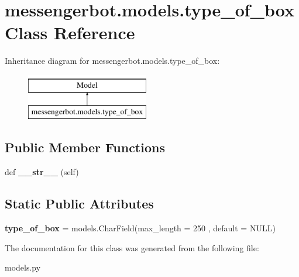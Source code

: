 \hypertarget{classmessengerbot_1_1models_1_1type__of__box}{}\section{messengerbot.\+models.\+type\+\_\+of\+\_\+box Class Reference}
\label{classmessengerbot_1_1models_1_1type__of__box}
Inheritance diagram for messengerbot.\+models.\+type\+\_\+of\+\_\+box\+:\begin{figure}[H]
\begin{center}
\leavevmode
\includegraphics[height=2.000000cm]{classmessengerbot_1_1models_1_1type__of__box}
\end{center}
\end{figure}
\subsection*{Public Member Functions}
\begin{DoxyCompactItemize}
\item 
\mbox{\label{classmessengerbot_1_1models_1_1type__of__box_ab6bfc5fff4cd1d8144d037d559cbb932}} 
def {\bfseries \+\_\+\+\_\+str\+\_\+\+\_\+} (self)
\end{DoxyCompactItemize}
\subsection*{Static Public Attributes}
\begin{DoxyCompactItemize}
\item 
\mbox{\label{classmessengerbot_1_1models_1_1type__of__box_a42410a03c6abf8fe27bb9b21ba3abe42}} 
{\bfseries type\+\_\+of\+\_\+box} = models.\+Char\+Field(max\+\_\+length = 250 , default = \textquotesingle{}N\+U\+LL\textquotesingle{})
\end{DoxyCompactItemize}


The documentation for this class was generated from the following file\+:\begin{DoxyCompactItemize}
\item 
models.\+py\end{DoxyCompactItemize}
